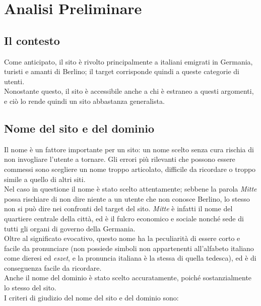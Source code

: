 \newpage
\section{Analisi Preliminare}
\subsection{Il contesto}
Come anticipato, il sito è rivolto principalmente a italiani emigrati in Germania, turisti e amanti di Berlino; il target corrisponde quindi a queste categorie di utenti. \\ 
Nonostante questo, il sito è accessibile anche a chi è estraneo a questi argomenti, e ciò lo rende quindi un sito abbastanza generalista.

\subsection{Nome del sito e del dominio}
Il nome è un fattore importante per un sito: un nome scelto senza cura rischia di non invogliare l'utente a tornare. Gli errori più rilevanti che possono essere commessi sono scegliere un nome troppo articolato, difficile da ricordare o troppo simile a quello di altri siti. \\
Nel caso in questione il nome è stato scelto attentamente; sebbene la parola \textit{Mitte} possa rischiare di non dire niente a un utente che non conosce Berlino, lo stesso non si può dire nei confronti del target del sito. \textit{Mitte} è infatti il nome del quartiere centrale della città, ed è il fulcro economico e sociale nonché sede di tutti gli organi di governo della Germania. \\
Oltre al significato evocativo, questo nome ha la peculiarità di essere corto e facile da pronunciare (non possiede simboli non appartenenti all'alfabeto italiano come dieresi ed \textit{eszet}, e la pronuncia italiana è la stessa di quella tedesca), ed è di conseguenza facile da ricordare. \\
Anche il nome del dominio è stato scelto accuratamente, poiché sostanzialmente lo stesso del sito. \\
I criteri di giudizio del nome del sito e del dominio sono:
